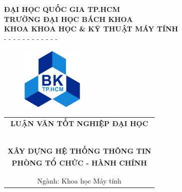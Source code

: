 \documentclass[12pt, a4paper]{report}
\begin{document}
\usetikzlibrary{calc}

\begin{titlepage}
\begin{center}
\textbf{\large{ĐẠI HỌC QUỐC GIA TP.HCM}}\\
\textbf{\large{TRƯỜNG ĐẠI HỌC BÁCH KHOA}}\\
\textbf{\large{KHOA KHOA HỌC \& KỸ THUẬT MÁY TÍNH}}\\
- - - - - - - - - - - -
\end{center}

\vspace{0.5cm}
\begin{figure}[H]
\begin{center}
\includegraphics[width=3cm]{img/LogoBK.jpg}
\end{center}
\end{figure}
\vspace{0.5cm}

\begin{center}
\begin{tabular}{c}
\multicolumn{1}{c}{\textbf{{\Large LUẬN VĂN TỐT NGHIỆP ĐẠI HỌC}}}\\
~~\\
\hline
\\
\multicolumn{1}{c}{\textbf{{\Large XÂY DỰNG HỆ THỐNG THÔNG TIN}}}\\
\textbf{{\Large PHÒNG TỔ CHỨC - HÀNH CHÍNH}}\\\\
\hline
\\
\large{Ngành: Khoa học Máy tính}
\end{tabular}
\end{center}


\end{titlepage}
\end{document}
